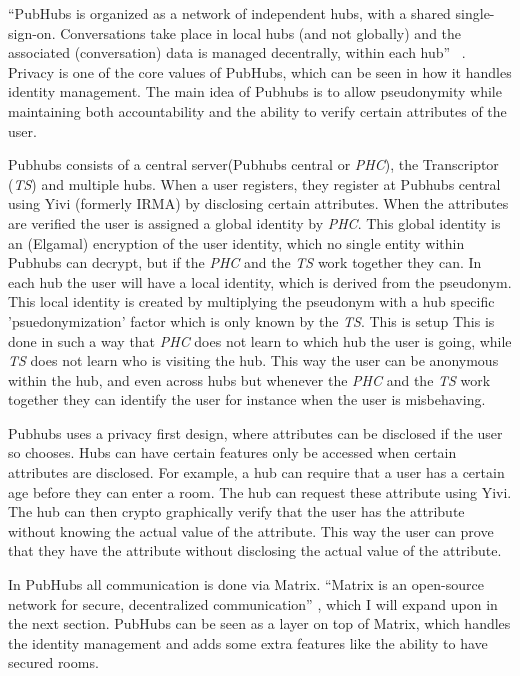 \documentclass{report}
\begin{document}
“PubHubs is organized as a network of independent hubs, with a shared single-sign-on. Conversations take place in
local hubs (and not globally) and the associated (conversation) data is managed decentrally, within each hub”~
\cite{jacobs_pubhubs_2023}
. Privacy is one of the core values of PubHubs, which can be seen in how it handles identity management. The main
idea of Pubhubs is to allow pseudonymity while maintaining both accountability and the ability to verify certain
attributes of the user.

Pubhubs consists of a central server(Pubhubs central or \textit{PHC}), the Transcriptor (\textit{TS}) and multiple hubs.
When a user registers, they register at Pubhubs central using Yivi (formerly IRMA)\cite{alpar_irma_nodate} by disclosing
certain attributes. When the attributes are verified the user is assigned a global identity by \textit{PHC}.
This global identity is an (Elgamal) encryption of the user identity, which no single entity within Pubhubs
can decrypt, but if the \textit{PHC} and the \textit{TS} work together they can.
In each hub the user will have a local identity, which is derived from the pseudonym.
This local identity is created by multiplying the pseudonym with a hub specific
'psuedonymization' factor which is only known by the
\textit{TS}. This is setup This is done in such a way that \textit{PHC} does not learn to which hub the user is going, while
\textit{TS} does not learn who is visiting the hub.
This way the user can be anonymous within the hub, and even across hubs but whenever the
\textit{PHC} and the \textit{TS} work together they can identify the user for instance when the user is misbehaving.

Pubhubs uses a privacy first design, where attributes can be disclosed if the user so chooses.
Hubs can have certain features only be accessed
when certain attributes are disclosed. For example, a hub can require that a user has a certain age before they can
enter a room. The hub can request these attribute using Yivi. The hub can then crypto graphically verify that the
user has the attribute without knowing the actual
value of
the attribute. This way the user can prove that they have the attribute without disclosing the actual value of the
attribute.

In PubHubs all communication is done via Matrix. “Matrix is an open-source network for secure, decentralized
communication” \cite{noauthor_matrixorg_nodate}, which I will expand upon in the next section. PubHubs can be seen as a
layer on top of Matrix, which handles the identity management and adds some extra features like the ability to have
secured rooms.
\end{document}
